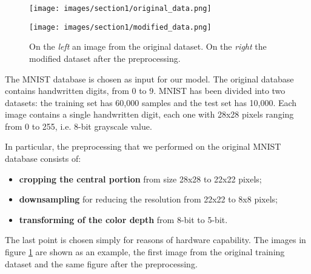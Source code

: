 \documentclass{article}
\begin{document}
\begin{figure}[H]
  \centering
  \begin{minipage}[c]{.4\textwidth}
   {\texttt{[image: images/section1/original\_data.png]}}
    \end{minipage}
    \qquad \qquad
      \begin{minipage}[c]{0.4\textwidth}
  {\texttt{[image: images/section1/modified\_data.png]}}
     \end{minipage}
     \quad
     
   \caption{On the \textit{left} an image from the original dataset.
   On the \textit{right} the modified dataset after the preprocessing.}
    \label{fig:MNIST}
\end{figure}

\par The MNIST database is chosen as input for our model.
The original database contains handwritten digits, from 0 to 9. 
MNIST has been divided into two datasets: the training set has 60,000 samples and the test set has 10,000.
Each image contains a single handwritten digit, each one with 28x28 pixels 
ranging from 0 to 255, i.e. 8-bit grayscale value.
\par In particular, the preprocessing that we performed on the original MNIST database consists of:
\begin{itemize}
    \item \textbf{cropping the central portion} from size 28x28 to 22x22 pixels;
    \item \textbf{downsampling} for reducing the resolution from 22x22 to 8x8 pixels;
    \item \textbf{transforming of the color depth} from 8-bit to 5-bit.
\end{itemize}

The last point is chosen simply for reasons of hardware capability.
The images in figure \ref{fig:MNIST} are shown as an example, the first image from the original training dataset
and the same figure after the preprocessing.



\end{document}
